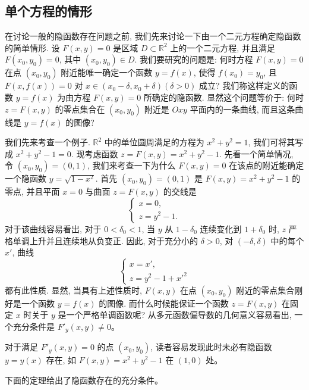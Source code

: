 \documentclass[UTF8,12pt,a4paper,fontset=fandol]{ctexart}
\begin{document}
\subsection{单个方程的情形}

在讨论一般的隐函数存在问题之前, 我们先来讨论一下由一个二元方程确定隐函数的简单情形. 设 $F(x,y)=0$ 是区域 $D\subset\mathbb R^2$ 上的一个二元方程, 并且满足 $F(x_0,y_0)=0$, 其中 $(x_0,y_0)\in D$. 我们要研究的问题是: 何时方程 $F(x,y)=0$ 在点 $(x_0,y_0)$ 附近能唯一确定一个函数 $y=f(x)$, 使得 $f(x_0)=y_0$, 且 $F(x,f(x))=0$ 对 $x\in(x_0-\delta,x_0+\delta)(\delta>0)$ 成立? 我们称这样定义的函数 $y=f(x)$ 为由方程 $F(x,y)=0$ 所确定的隐函数. 显然这个问题等价于: 何时 $z=F(x,y)$ 的零点集合在 $(x_0,y_0)$ 附近是 $Oxy$ 平面内的一条曲线, 而且这条曲线是 $y=f(x)$ 的图像?

我们先来考查一个例子. $\mathbb R^2$ 中的单位圆周满足的方程为 $x^2+y^2=1$, 我们可将其写成 $x^2+y^2-1=0$. 现考虑函数 $z=F(x,y)=x^2+y^2-1$. 先看一个简单情况, 令 $(x_0,y_0)=(0,1)$, 我们来考查一下为什么 $F(x,y)=0$ 在该点的附近能确定一个隐函数 $y=\sqrt{1-x^2}$. 首先 $(x_0,y_0)=(0,1)$ 是 $F(x,y)=x^2+y^2-1$ 的零点, 并且平面 $x=0$ 与曲面 $z=F(x,y)$ 的交线是
\[
  \begin{cases}
    x=0,\\
    z=y^2-1.
  \end{cases}
\]
对于该曲线容易看出, 对于 $0<\delta_0<1$, 当 $y$ 从 $1-\delta_0$ 连续变化到 $1+\delta_0$ 时, $z$ 严格单调上升并且连续地从负变正. 因此, 对于充分小的 $\delta>0$, 对 $(-\delta,\delta)$ 中的每个 $x'$, 曲线
\[
  \begin{cases}
    x=x',\\
    z=y^2-1+x'^2
  \end{cases}
\]
都有此性质. 显然, 当具有上述性质时, $F(x,y)$ 在点 $(x_0,y_0)$ 附近的零点集合刚好是一个函数 $y=f(x)$ 的图像. 而什么时候能保证一个函数 $z=F(x,y)$ 在固定 $x$ 时关于 $y$ 是一个严格单调函数呢? 从多元函数偏导数的几何意义容易看出, 一个充分条件是 $F'_y(x,y)\ne0$。

对于满足 $F'_y(x,y)=0$ 的点 $(x_0,y_0)$, 读者容易发现此时未必有隐函数 $y=y(x)$ 存在, 如 $F(x,y)=x^2+y^2-1$ 在 $(1,0)$ 处。

下面的定理给出了隐函数存在的充分条件。
\end{document}
